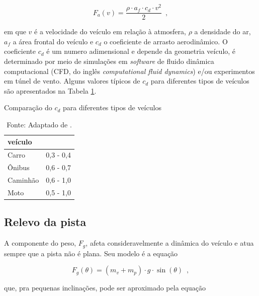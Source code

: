\begin{equation}
	\label{eq:Fa}
	F_a(v) = \frac{\rho \cdot a_f \cdot c_d \cdot v^2}{2}
	\enspace,
\end{equation}

em que $v$ é a velocidade do veículo em relação à atmosfera, $\rho$ a densidade do ar, $a_{f}$ a área frontal do
veículo e $c_{d}$ o coeficiente de arrasto aerodinâmico.
O coeficiente $c_{d}$ é um numero adimensional e depende da geometria veículo, é determinado por meio de simulações em \textit{software} de fluido
dinâmica
computacional (CFD, do inglês \textit{computational fluid dynamics}) e/ou experimentos em túnel de vento. \cite[Seç.~2.1.1]{book:guzzella2012vehicle} Alguns
valores típicos de $c_{d}$ para diferentes tipos de
veículos são apresentados na Tabela \ref{tab:ComparacaoCD}.

\begin{table}[h]
	\centering
	\caption{Comparação do $c_{d}$ para diferentes tipos de veículos}
	\begin{tabular}{ll}
		\toprule
		\textbf{veículo} & \boldsymbol{$c_{d}$} \\
		\hline
		Carro            & 0,3 - 0,4            \\
		Ônibus           & 0,6 - 0,7            \\
		Caminhão         & 0,6 - 1,0            \\
		Moto             & 0,5 - 1,0            \\
		\bottomrule
	\end{tabular}
	\caption*{\footnotesize Fonte: Adaptado de . \cite[Seç.~8.3]{book:GroundVehicleDynamics}}
	\label{tab:ComparacaoCD}
\end{table}

\subsection{Relevo da pista}

A componente do peso, $F_{g}$, afeta consideravelmente a dinâmica do veículo e atua sempre que a pista não é plana. Seu modelo é a equação

\begin{equation}
	\label{eq:Fg}
	F_{g}(\theta) = (m_v + m_p) \cdot g \cdot \sin(\theta)
	\enspace,
\end{equation}

que, pra pequenas inclinações, pode ser aproximado pela equação

